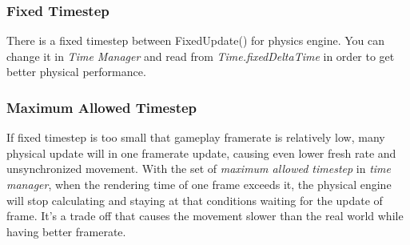 \documentclass[10pt, a4paper]{article}
\begin{document}
            \subsubsection{Fixed Timestep}
                There is a fixed timestep between FixedUpdate() for physics engine. You can change it in \emph{Time Manager} and read from \emph{Time.fixedDeltaTime} in order to get better physical performance.  
            \subsubsection{Maximum Allowed Timestep}
                If fixed timestep is too small that gameplay framerate is relatively low, many physical update will in one framerate update, causing even lower fresh rate and unsynchronized movement. With the set of \emph{maximum allowed timestep} in \emph{time manager}, when the rendering time of one frame exceeds it, the physical engine will stop calculating and staying at that conditions waiting for the update of frame. It's a trade off that causes the movement slower than the real world while having better framerate.  
\end{document}
